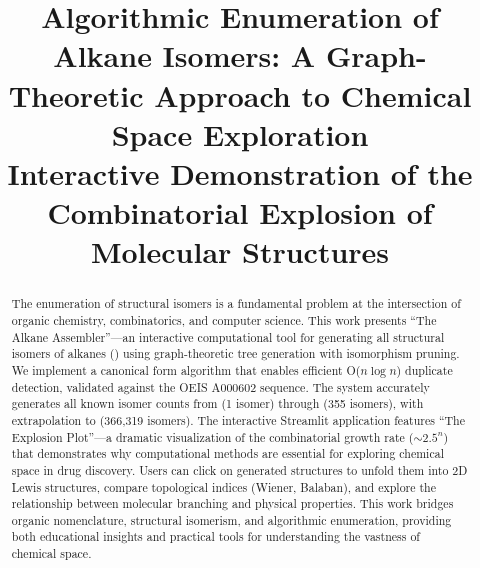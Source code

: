 \documentclass[conference]{IEEEtran}
\begin{document}
\title{Algorithmic Enumeration of Alkane Isomers: A Graph-Theoretic Approach to Chemical Space Exploration\\
{\footnotesize Interactive Demonstration of the Combinatorial Explosion of Molecular Structures}
}

\author{
\and
\IEEEauthorblockN{}
}

\maketitle

\begin{abstract}
The enumeration of structural isomers is a fundamental problem at the intersection of organic chemistry, combinatorics, and computer science. This work presents ``The Alkane Assembler''---an interactive computational tool for generating all structural isomers of alkanes () using graph-theoretic tree generation with isomorphism pruning. We implement a canonical form algorithm that enables efficient O($n \log n$) duplicate detection, validated against the OEIS A000602 sequence. The system accurately generates all known isomer counts from  (1 isomer) through  (355 isomers), with extrapolation to  (366,319 isomers). The interactive Streamlit application features ``The Explosion Plot''---a dramatic visualization of the combinatorial growth rate ($\sim 2.5^n$) that demonstrates why computational methods are essential for exploring chemical space in drug discovery. Users can click on generated structures to unfold them into 2D Lewis structures, compare topological indices (Wiener, Balaban), and explore the relationship between molecular branching and physical properties. This work bridges organic nomenclature, structural isomerism, and algorithmic enumeration, providing both educational insights and practical tools for understanding the vastness of chemical space.
\end{abstract}
\end{document}
